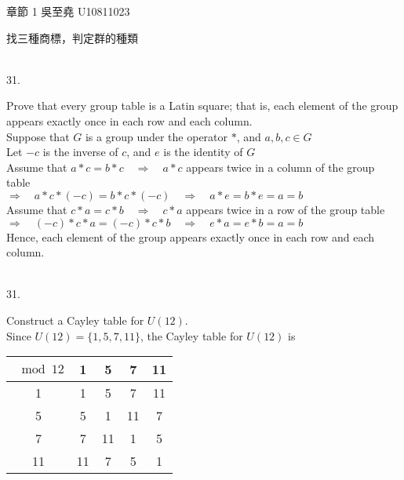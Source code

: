 \documentclass[12pt]{book}
\author{andersonwu2000}
\begin{document}
\begin{CJK}{UTF8}{bsmi}

\hfill 章節 1 吳至堯 U10811023

\begin{minipage}[t]{\dimexpr\linewidth-2em}
找三種商標，判定群的種類 
\begin{figure}[H] 
\centering 
{}
\centering 
{}
\centering 
{}
\end{figure}
\end{minipage}\\

31. \begin{minipage}[t]{\dimexpr\linewidth-2em}
Prove that every group table is a Latin square; that is, each element of the group appears exactly once in each row and each column. \\
Suppose that $G$ is a group under the operator $*$, and $a, b, c\in G$ \\
Let $-c$ is the inverse of $c$, and $e$ is the identity of $G$ \\
Assume that $a*c=b*c\quad\Rightarrow\quad a*c$ appears twice in a column of the group table \\
$\Rightarrow\quad a*c*(-c)=b*c*(-c)\quad\Rightarrow\quad a*e=b*e=a=b$ \\
Assume that $c*a=c*b\quad\Rightarrow\quad c*a$ appears twice in a row of the group table \\
$\Rightarrow\quad (-c)*c*a=(-c)*c*b\quad\Rightarrow\quad e*a=e*b=a=b$ \\
Hence, each element of the group appears exactly once in each row and each column.
\end{minipage}\\

31. \begin{minipage}[t]{\dimexpr\linewidth-2em}
Construct a Cayley table for $U(12)$. \\
Since $U(12)=\{1,5,7,11\}$, the Cayley table for $U(12)$ is \\[5pt]
\begin{tabular}{c|c|c|c|c}
    $\mod 12$ & 1 & 5 & 7 & 11 \\\hline
    1 & 1 & 5 & 7 & 11 \\\hline
    5 & 5 & 1 & 11 & 7 \\\hline
    7 & 7 & 11 & 1 & 5 \\\hline
    11 & 11 & 7 & 5 & 1
\end{tabular}
\end{minipage}\\

\end{CJK}
\end{document}
